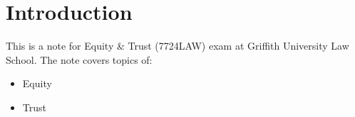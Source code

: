 \section*{Introduction}

This is a note for Equity \& Trust (7724LAW) exam at Griffith University Law School. The note covers topics of:
\begin{itemize}
    \item Equity
    \item Trust
\end{itemize}
